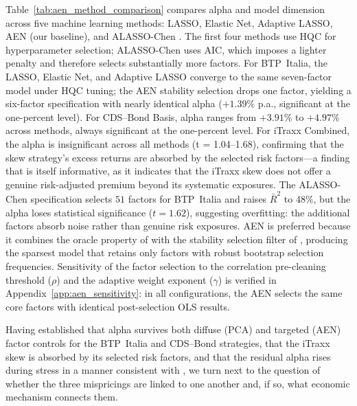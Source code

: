 Table~\ref{tab:aen_method_comparison} compares alpha and model
dimension across five machine learning methods: LASSO, Elastic
Net, Adaptive LASSO, AEN (our baseline), and ALASSO-Chen
\citep{chen2025anomalies}. The first four methods use HQC for
hyperparameter selection; ALASSO-Chen uses AIC, which imposes a
lighter penalty and therefore selects substantially more factors.
For BTP~Italia, the LASSO, Elastic Net, and Adaptive LASSO converge
to the same seven-factor model under HQC tuning; the AEN stability
selection drops one factor, yielding a six-factor specification with
nearly identical alpha ($+1.39\%$ p.a., significant at the
one-percent level). For CDS--Bond
Basis, alpha ranges from $+3.91\%$ to $+4.97\%$ across methods,
always significant at the one-percent level. For iTraxx Combined, the alpha 
is insignificant across all methods (t = 1.04–1.68), confirming that the skew strategy's excess returns
are absorbed by the selected risk factors---a finding that is itself
informative, as it indicates that the iTraxx skew does not offer a
genuine risk-adjusted premium beyond its systematic exposures. The
ALASSO-Chen specification selects $51$ factors for BTP~Italia and
raises $\bar{R}^2$ to $48\%$, but the alpha loses statistical
significance ($t = 1.62$), suggesting overfitting: the additional
factors absorb noise rather than genuine risk exposures. AEN is preferred because it combines the
oracle property of \citet{zou2009adaptive} with the stability
selection filter of \citet{meinshausen2010stability}, producing the
sparsest model that retains only factors with robust bootstrap
selection frequencies. Sensitivity of the factor selection to
the correlation pre-cleaning threshold ($\rho$) and the adaptive
weight exponent ($\gamma$) is verified in
Appendix~\ref{app:aen_sensitivity}: in all configurations, the
AEN selects the same core factors with identical post-selection
OLS results.
 
Having established that alpha survives both diffuse (PCA) and
targeted (AEN) factor controls for the BTP~Italia and CDS--Bond
strategies, that the iTraxx skew is absorbed by its selected
risk factors, and that the residual alpha rises during stress
in a manner consistent with \citet{duffie2010presidential}, we
turn next to the question of whether the three mispricings are
linked to one another and, if so, what economic mechanism
connects them.